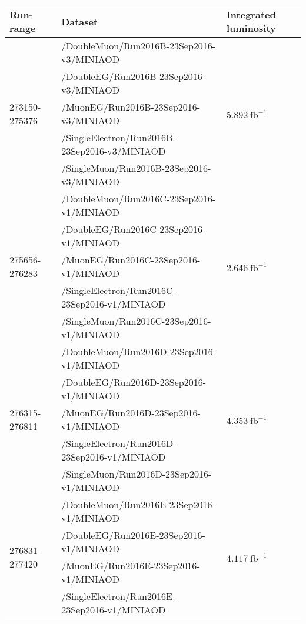 \begin{table}[h]
\scriptsize
    \centering
    \begin{tabular}{|l|l|l|}
\hline %
\hline %
Run-range & Dataset & Integrated luminosity \\
\hline %
\hline %
\multirow{5}{*}{273150-275376} & /DoubleMuon/Run2016B-23Sep2016-v3/MINIAOD &  \multirow{5}{*}{$5.892\ \text{fb}^{-1}$} \\
& /DoubleEG/Run2016B-23Sep2016-v3/MINIAOD &  \\
& /MuonEG/Run2016B-23Sep2016-v3/MINIAOD &  \\
& /SingleElectron/Run2016B-23Sep2016-v3/MINIAOD &  \\
& /SingleMuon/Run2016B-23Sep2016-v3/MINIAOD &  \\
\hline
\multirow{5}{*}{275656-276283} & /DoubleMuon/Run2016C-23Sep2016-v1/MINIAOD &  \multirow{5}{*}{$2.646\ \text{fb}^{-1}$}  \\
& /DoubleEG/Run2016C-23Sep2016-v1/MINIAOD &  \\
& /MuonEG/Run2016C-23Sep2016-v1/MINIAOD &  \\
& /SingleElectron/Run2016C-23Sep2016-v1/MINIAOD &  \\
& /SingleMuon/Run2016C-23Sep2016-v1/MINIAOD &  \\
\hline
\multirow{5}{*}{276315-276811} & /DoubleMuon/Run2016D-23Sep2016-v1/MINIAOD &  \multirow{5}{*}{$4.353\ \text{fb}^{-1}$} \\
& /DoubleEG/Run2016D-23Sep2016-v1/MINIAOD &  \\
& /MuonEG/Run2016D-23Sep2016-v1/MINIAOD &  \\
& /SingleElectron/Run2016D-23Sep2016-v1/MINIAOD &  \\
& /SingleMuon/Run2016D-23Sep2016-v1/MINIAOD &  \\
\hline
\multirow{5}{*}{276831-277420} & /DoubleMuon/Run2016E-23Sep2016-v1/MINIAOD &  \multirow{5}{*}{$4.117\ \text{fb}^{-1}$} \\
& /DoubleEG/Run2016E-23Sep2016-v1/MINIAOD &  \\
& /MuonEG/Run2016E-23Sep2016-v1/MINIAOD &  \\
& /SingleElectron/Run2016E-23Sep2016-v1/MINIAOD &  \\

\end{tabular}
\end{table}
